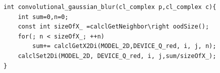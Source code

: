\begin{minipage}{\linewidth}
\begin{lstlisting}
int convolutional_gaussian_blur(cl_complex p,cl_complex c){
    int sum=0,n=0;
    const int sizeOfX_ =calclGetNeighbor\right oodSize();
    for(; n < sizeOfX_; ++n) 
        sum+= calclGetX2Di(MODEL_2D,DEVICE_Q_red, i, j, n);
    calclSet2Di(MODEL_2D, DEVICE_Q_red, i, j,sum/sizeOfX_);
}
\end{lstlisting}
\end{minipage}
